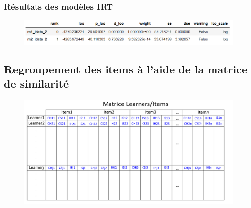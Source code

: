 \documentclass[aspectratio=169,professionalfonts, 12pt]{beamer}
\begin{document}
\begin{frame}
  \frametitle{Résultats des modèles IRT}
  \justifying
  \begin{minipage}{\textwidth}
    \begin{figure}[H]
      \begin{center}
        \includegraphics[scale=0.6]{images/etat_art/model_selection.png}
      \end{center}
    \end{figure}
  \end{minipage}
\end{frame}

\subsection{Regroupement des items à l’aide de la matrice de similarité}

\begin{frame}
  \justifying 
  \begin{minipage}{\textwidth}
    \begin{figure}[H]
      \begin{center}
        \includegraphics[scale=0.18]{images/contribution/matrice_learners-items.png}
      \end{center}
    \end{figure}
  \end{minipage}
\end{frame}
\end{document}
